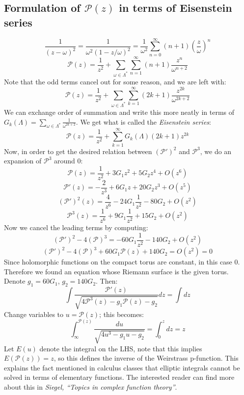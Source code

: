 \documentclass[12 pt]{article}
\theoremstyle{plain}
\theoremstyle{definition}
\theoremstyle{remark}
\begin{document}
\subsection*{Formulation of $\mathcal{P}(z)$ in terms of Eisenstein series}
\[     \frac{1}{(z-\omega)^2} = \frac{1}{\omega^2 (1 - z/\omega)^2} =   \frac{1}{\omega^2} \sum_{n=0}^{\infty} (n+1) \left(\frac{z}{\omega} \right)^n   \]
\[       \mathcal{P} (z) = \frac{1}{z^2} + \sum_{\omega \in \Lambda^*} \sum_{n=1}^{\infty} (n+1)   \frac{z^n}{\omega^{n+2}}        \]
Note that the odd terms cancel out for some reason, and we are left with:
\[     \mathcal{P} (z) =    \frac{1}{z^2} + \sum_{\omega \in \Lambda^*} \sum_{k=1}^{\infty} (2k+1)   \frac{z^{2k}}{\omega^{2k+2}}       \]
We can exchange order of summation and write this more neatly in terms of $G_k(\Lambda) = \sum_{\omega \in \Lambda^*} \frac{1}{\omega^{2k+2}}$. We get what is called the \emph{Eisenstein series}:
\[      \mathcal{P}(z) = \frac{1}{z^2} + \sum_{k=1}^{\infty} G_k (\Lambda) (2k+1) z^{2k}     \]
Now, in order to get the desired relation between $(\mathcal{P}')^2$ and $\mathcal{P}^3$, we do an expansion of $\mathcal{P}^3$ around 0:
\[        \mathcal{P} (z) = \frac{1}{z^2} + 3G_1 z^2 + 5 G_2 z^4 + O(z^6)     \]
\[         \mathcal{P}' (z)  = - \frac{2}{z^3} + 6 G_1 z + 20 G_2 z^3 + O(z^5)       \]
\[       (\mathcal{P}')^2 (z) = \frac{4}{z^6} - 24 G_1 \frac{1}{z^2} - 80 G_2 + O(z^2)     \]
\[       \mathcal{P}^3(z) = \frac{1}{z^6} + 9G_1 \frac{1}{z^2} + 15 G_2   + O(z^2)   \]
Now we cancel the leading terms by computing:
\[ ( \mathcal{P}')^2 - 4(\mathcal{P})^3 = - 60 G_1 \frac{1}{z^2} - 140 G_2 + O(z^2)     \]
\[      ( \mathcal{P}')^2 - 4(\mathcal{P})^3 + 60 G_1 \mathcal{P} (z) + 140 G_2 = O(z^2) = 0       \]
Since holomorphic functions on the compact torus are constant, in this case 0. Therefore we found an equation whose Riemann surface is the given torus. Denote $g_1 = 60 G_1$, $g_2 = 140 G_2$. Then:
\[     \int \frac{\mathcal{P}' (z)}{\sqrt{4\mathcal{P}^3(z) - g_1 \mathcal{P}(z) - g_2}} dz  =  \int dz    \]
Change variables to $u = \mathcal{P} (z)$; this becomes:
\[     \int_{\infty}^{\mathcal{P}(z)} \frac{du}{\sqrt{4u^3 - g_1 u - g_2}}  = \int_0^z dz = z  \]
Let $E(u)$ denote the integral on the LHS, note that this implies $E(\mathcal{P}(z)) = z$, so this defines the inverse of the Weirstrass p-function. This explains the fact mentioned in calculus classes that elliptic integrals cannot be solved in terms of elementary functions. The interested reader can find more about this in \emph{Siegel, ``Topics in complex function theory''}.
\end{document}
